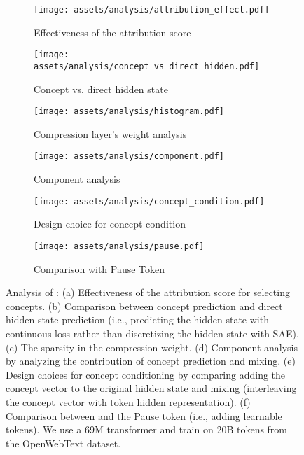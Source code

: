 \begin{figure*}[t]
\centering\small
\begin{subfigure}{0.3275\textwidth}
    \texttt{[image: assets/analysis/attribution\_effect.pdf]}
    \caption{Effectiveness of the attribution score}
    \label{fig:attribution_effect}
\end{subfigure}
\begin{subfigure}{0.3275\textwidth}
    \texttt{[image: assets/analysis/concept\_vs\_direct\_hidden.pdf]}
    \caption{Concept vs. direct hidden state}
    \label{fig:sae_vs_direct_hidden}
\end{subfigure}
\begin{subfigure}{0.3275\textwidth}
    \texttt{[image: assets/analysis/histogram.pdf]}
    \caption{Compression layer's weight analysis}
    \label{fig:compress_weight}
\end{subfigure}
\begin{subfigure}{0.3275\textwidth}
    \texttt{[image: assets/analysis/component.pdf]}
    \caption{Component analysis}
    \label{fig:component}
\end{subfigure}
\begin{subfigure}{0.3275\textwidth}
    \texttt{[image: assets/analysis/concept\_condition.pdf]}
    \caption{Design choice for concept condition}
    \label{fig:concept_condition}
\end{subfigure}
\begin{subfigure}{0.3275\textwidth}
    \texttt{[image: assets/analysis/pause.pdf]}
    \caption{Comparison with Pause Token}
    \label{fig:pause_token}
\end{subfigure}
\caption{
Analysis of \sname: (a) Effectiveness of the attribution score for selecting concepts. (b) Comparison between concept prediction and direct hidden state prediction (i.e., predicting the hidden state with continuous loss rather than discretizing the hidden state with SAE). (c) The sparsity in the compression weight. (d) Component analysis by analyzing the contribution of concept prediction and mixing. (e) Design choices for concept conditioning by comparing adding the concept vector to the original hidden state and mixing (interleaving the concept vector with token hidden representation). (f) Comparison between \sname and the Pause token (i.e., adding learnable tokens). We use a 69M transformer and train on 20B tokens from the OpenWebText dataset.
}
\label{fig:analysis}
\end{figure*}
